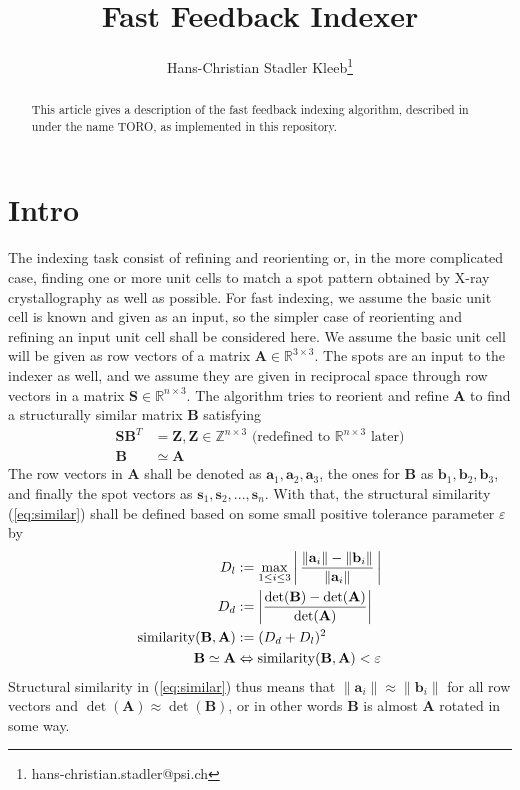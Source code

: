 \documentclass[a4paper,10pt]{article}
\title{Fast Feedback Indexer}
\author{Hans-Christian Stadler Kleeb\thanks{hans-christian.stadler@psi.ch}}
\DeclareMathOperator{\similar}{similarity}
\newcommand{\vect}[1]{\mathbf{#1}}
\newcommand{\mat}[1]{\mathbf{#1}}
\begin{document}
\maketitle

\begin{abstract}
This article gives a description of the fast feedback indexing algorithm, described in \cite{toro-indexer} under the name TORO, as implemented in this repository.
\end{abstract}

\section{Intro}\label{sec:intro}
The indexing task consist of refining and reorienting or, in the more complicated case, finding one or more unit cells to match a spot pattern obtained by X-ray crystallography as well as possible. For fast indexing, we assume the basic unit cell is known and given as an input, so the simpler case of reorienting and refining an input unit cell shall be considered here. We assume the basic unit cell will be given as row vectors of a matrix $\mat{A} \in \mathbb{R}^{3 \times 3}$. The spots are an input to the indexer as well, and we assume they are given in reciprocal space through row vectors in a matrix $\mat{S} \in \mathbb{R}^{n \times 3}$. The algorithm tries to reorient and refine $\mat{A}$ to find a structurally similar matrix $\mat{B}$ satisfying
%
\begin{align}
 \label{eq:integer} \mat{S} \mat{B}^T &= \mat{Z}, \mat{Z} \in \mathbb{Z}^{n \times 3}\text{ (redefined to }\mathbb{R}^{n\times 3}\text{ later)} \\
 \label{eq:similar} \mat{B} &\simeq \mat{A}
\end{align}
%
The row vectors in $\mat{A}$ shall be denoted as $\vect{a}_1,\vect{a}_2,\vect{a}_3$, the ones for $\mat{B}$ as $\vect{b}_1,\vect{b}_2,\vect{b}_3$, and finally the spot vectors as $\vect{s}_1, \vect{s}_2, ..., \vect{s}_n$. With that, the structural similarity (\ref{eq:similar}) shall be defined based on some small positive tolerance parameter $\varepsilon$ by
%
\begin{align}\label{eq:similarity}
  D_l &:= \max_{1 \leq i \leq 3} \left |\, \frac{\| \vect{a}_i \| - \| \vect{b}_i \|}{\| \vect{a}_i \|}\, \right | \notag \\
  D_d &:= \left | \frac{\det(\mat{B}) - \det(\mat{A})}{\det(\mat{A})} \right | \notag \\
 \similar(\mat{B}, \mat{A}) &:= ( D_d + D_l )^2 \\
  \mat{B} \simeq \mat{A} &\Leftrightarrow \similar(\mat{B}, \mat{A}) < \varepsilon \notag
\end{align}
%
Structural similarity in (\ref{eq:similar}) thus means that $\|\vect{a}_i\| \approx \|\vect{b}_i\|$ for all row vectors and $\det(\mat{A}) \approx \det(\mat{B})$, or in other words $\mat{B}$ is almost $\mat{A}$ rotated in some way.
\end{document}
